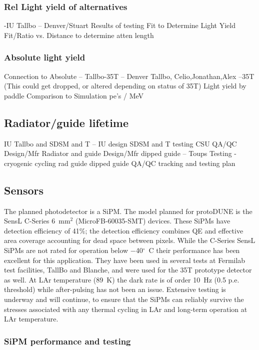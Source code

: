 \subsubsection{Rel Light yield of alternatives}
      -IU Tallbo -- Denver/Stuart
     Results of testing
     Fit to Determine Light Yield
     Fit/Ratio vs. Distance to determine atten length     

\subsubsection{Absolute light yield}
     Connection to Absolute -- Tallbo-35T  -- Denver Tallbo, Celio,Jonathan,Alex --35T
     (This could get dropped, or altered depending on status of 35T)
     Light yield by paddle
     Comparison to Simulation
     pe's / MeV 

\subsection{Radiator/guide lifetime}
     IU Tallbo and SDSM and T  -- IU design SDSM and T testing  CSU QA/QC
     Design/Mfr Radiator and guide
     Design/Mfr dipped guide -- Toups
     Testing - cryogenic cycling 
          rad
          guide
          dipped guide
     QA/QC tracking and testing plan  

\subsection{Sensors}
The planned photodetector is a SiPM.  
The model planned for protoDUNE is the SensL C-Series 6~mm$^2$
(MicroFB-60035-SMT) devices. These SiPMs have detection efficiency of
41\%; the detection efficiency combines QE and effective area
  coverage accounting for dead space between pixels. While the
C-Series SensL SiPMs are not rated for operation below
$-$40$^{\circ}$~C their performance has been excellent for this
application. 
They have been used in several tests at Fermilab test facilities,
TallBo and Blanche, and were used for the 35T prototype detector
as well.  At LAr temperature (89~K) the dark rate is of order 10~Hz
(0.5 p.e. threshold) while after-pulsing has not been an
issue. Extensive testing is underway and will continue, to ensure 
that the SiPMs can reliably survive the stresses associated with 
any thermal cycling in LAr and long-term operation at LAr temperature.

\subsubsection{SiPM performance and testing}

